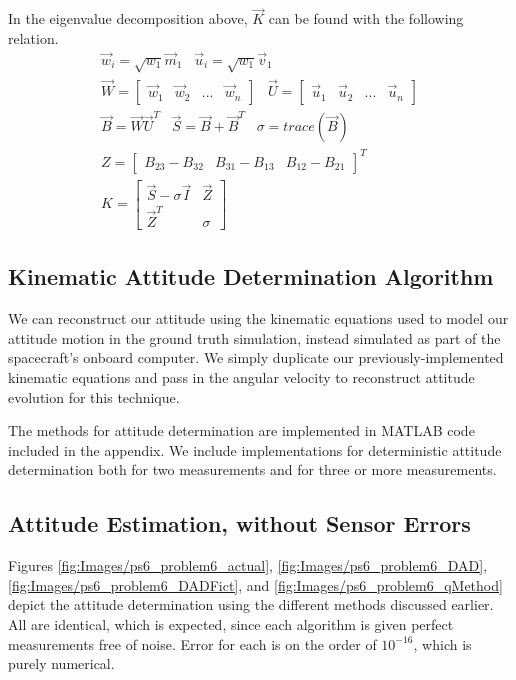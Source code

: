 In the eigenvalue decomposition above, $\Vec{K}$ can be found with the following relation.
\begin{align*}
    \Vec{w}_i = \sqrt{w_1} \Vec{m}_1 \;\;\;
    \Vec{u}_i = \sqrt{w_1} \Vec{v}_1 \\
    \Vec{W} = 
    \begin{bmatrix}
        \Vec{w}_1 & \Vec{w}_2 & ... & \Vec{w}_n
    \end{bmatrix} \;\;\;
    \Vec{U} = 
    \begin{bmatrix}
        \Vec{u}_1 & \Vec{u}_2 & ... & \Vec{u}_n
    \end{bmatrix} \\
    \Vec{B} = \Vec{W} \Vec{U}^T \;\;\;
    \Vec{S} = \Vec{B} + \Vec{B}^T \;\;\;
    \sigma = trace (\Vec{B}) \\
    Z = 
    \begin{bmatrix}
        B_{23} - B_{32} & B_{31} - B_{13} & B_{12} - B_{21}
    \end{bmatrix} ^T \\
    K = 
    \begin{bmatrix}
        \Vec{S} - \sigma \Vec{I} & \Vec{Z} \\
        \Vec{Z}^T & \sigma
    \end{bmatrix}
\end{align*}

\subsection{Kinematic Attitude Determination Algorithm}
We can reconstruct our attitude using the kinematic equations used to model our attitude motion in the ground truth simulation, instead simulated as part of the spacecraft's onboard computer. We simply duplicate our previously-implemented kinematic equations and pass in the angular velocity to reconstruct attitude evolution for this technique.

The methods for attitude determination are implemented in MATLAB code included in the appendix. We include implementations for deterministic attitude determination both for two measurements and for three or more measurements.

\subsection{Attitude Estimation, without Sensor Errors}
Figures \ref{fig:Images/ps6_problem6_actual}, \ref{fig:Images/ps6_problem6_DAD}, \ref{fig:Images/ps6_problem6_DADFict}, and \ref{fig:Images/ps6_problem6_qMethod} depict the attitude determination using the different methods discussed earlier. All are identical, which is expected, since each algorithm is given perfect measurements free of noise. Error for each is on the order of $10^{-16}$, which is purely numerical.

